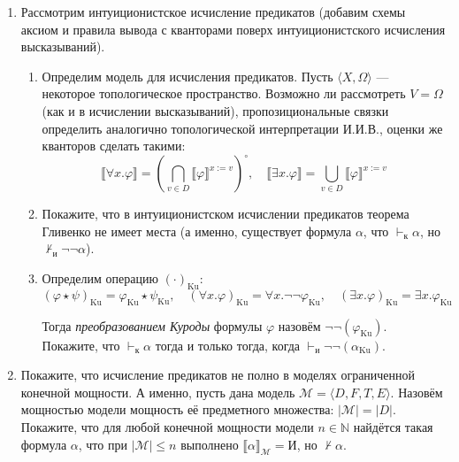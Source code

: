 \documentclass[10pt,a4paper,oneside]{article}
\begin{document}
\begin{enumerate}
\item Рассмотрим интуиционистское исчисление предикатов (добавим схемы аксиом и правила вывода с кванторами
поверх интуиционистского исчисления высказываний).
\begin{enumerate}
\item Определим модель для исчисления предикатов. Пусть $\langle X, \Omega\rangle$ --- некоторое топологическое
пространство. Возможно ли рассмотреть $V = \Omega$ (как и в исчислении высказываний),
пропозициональные связки определить аналогично топологической интерпретации И.И.В., 
оценки же кванторов сделать такими:
$$\llbracket \forall x.\varphi \rrbracket = \left(\bigcap_{v \in D} \llbracket \varphi \rrbracket^{x := v}\right)^\circ,\quad
  \llbracket \exists x.\varphi \rrbracket = \bigcup_{v \in D} \llbracket \varphi \rrbracket^{x := v}$$

\item Покажите, что в интуиционистском исчислении предикатов теорема Гливенко не имеет места
(а именно, существует формула $\alpha$, что $\vdash_\text{к}\alpha$, но $\not\vdash_\text{и}\neg\neg\alpha$).
\item Определим операцию $(\cdot)_\text{Ku}$:
$$(\varphi\star\psi)_\text{Ku} = \varphi_\text{Ku} \star \psi_\text{Ku}, \quad 
(\forall x.\varphi)_\text{Ku} = \forall x.\neg\neg\varphi_\text{Ku}, \quad
(\exists x.\varphi)_\text{Ku} = \exists x.\varphi_\text{Ku}$$

Тогда \emph{преобразованием Куроды} формулы $\varphi$ назовём $\neg\neg(\varphi_\text{Ku})$. 
Покажите, что $\vdash_\text{к}\alpha$ тогда и только тогда, когда $\vdash_\text{и}\neg\neg(\alpha_\text{Ku})$.
\end{enumerate}

\item Покажите, что исчисление предикатов не полно в моделях ограниченной конечной мощности. 
А именно, пусть дана модель $\mathcal{M} = \langle D, F, T, E \rangle$. 
Назовём мощностью модели мощность её предметного множества: $|\mathcal{M}| = |D|$.
Покажите, что для любой конечной мощности модели $n\in\mathbb{N}$ найдётся такая формула $\alpha$, что 
при $|\mathcal{M}|\le n$ выполнено $\llbracket\alpha\rrbracket_\mathcal{M} = \text{И}$, но $\not\vdash\alpha$.
\end{enumerate}
\end{document}
